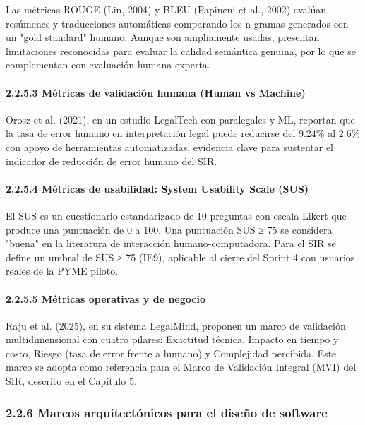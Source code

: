 \documentclass[12pt,a4paper,oneside]{report}
\begin{document}
Las métricas ROUGE (Lin, 2004) y BLEU (Papineni et al., 2002) evalúan
resúmenes y traducciones automáticas comparando los n-gramas generados
con un "gold standard" humano. Aunque son ampliamente usadas, presentan
limitaciones reconocidas para evaluar la calidad semántica genuina, por
lo que se complementan con evaluación humana experta.

\paragraph{2.2.5.3 Métricas de validación humana (Human vs
Machine)}\label{muxe9tricas-de-validaciuxf3n-humana-human-vs-machine}

Orosz et al. (2021), en un estudio LegalTech con paralegales y ML,
reportan que la tasa de error humano en interpretación legal puede
reducirse del 9.24\% al 2.6\% con apoyo de herramientas automatizadas,
evidencia clave para sustentar el indicador de reducción de error humano
del SIR.

\paragraph{2.2.5.4 Métricas de usabilidad: System Usability Scale
(SUS)}\label{muxe9tricas-de-usabilidad-system-usability-scale-sus}

El SUS es un cuestionario estandarizado de 10 preguntas con escala
Likert que produce una puntuación de 0 a 100. Una puntuación SUS ≥ 75 se
considera "buena" en la literatura de interacción humano-computadora.
Para el SIR se define un umbral de SUS ≥ 75 (IE9), aplicable al cierre
del Sprint 4 con usuarios reales de la PYME piloto.

\paragraph{2.2.5.5 Métricas operativas y de
negocio}\label{muxe9tricas-operativas-y-de-negocio}

Raju et al. (2025), en su sistema LegalMind, proponen un marco de
validación multidimensional con cuatro pilares: Exactitud técnica,
Impacto en tiempo y costo, Riesgo (tasa de error frente a humano) y
Complejidad percibida. Este marco se adopta como referencia para el
Marco de Validación Integral (MVI) del SIR, descrito en el Capítulo 5.

\subsubsection{2.2.6 Marcos arquitectónicos para el diseño de
software}\label{marcos-arquitectuxf3nicos-para-el-diseuxf1o-de-software}
\end{document}
